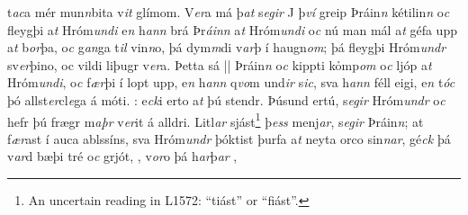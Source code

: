 t\textit{ac}a mér mun\textit{n}bita   v\textit{it} glímom. V\textit{er}a má þ\textit{at}
s\textit{egir}  J þ\textit{ví} greip Þráin\textit{n} kétilin\textit{n}
o\textit{c}  fleygþi   a\textit{t} Hróm\textit{undi}
e\textit{n} h\textit{ann} brá    Þr\textit{áinn} a\textit{t} Hróm\textit{undi} o\textit{c}  nú man mál a\textit{t} géfa upp a\textit{t} b\textit{or}þa, o\textit{c} g\textit{an}ga t\textit{il} vin\textit{n}o, þá dym\textit{m}di    v\textit{ar}þ í haugn\textit{om}; þá  fleygþi
Hróm\textit{undr} sv\textit{er}þino, oc vildi   liþugr   v\textit{er}a. Þetta sá 
||
 Þráin\textit{n} o\textit{c}  kippti  kỏmp\textit{om}
o\textit{c} ljóp a\textit{t} Hróm\textit{undi}, o\textit{c} f\textit{ær}þi   í  lopt upp, e\textit{n} h\textit{ann} q\textit{vo}m 
 und\textit{ir} s\textit{ic}, 
sva h\textit{ann} féll  eigi,
e\textit{n} t\textit{óc} þó allst\textit{er}cl\textit{e}ga á móti.  
: e\textit{ck}i  erto   a\textit{t} þú stendr. 
Þúsund   ertú,  s\textit{egir} Hróm\textit{undr} o\textit{c} hefr þú
frægr m\textit{aþr} v\textit{er}it á   alldri. Litl\textit{ar} sjást\footnote{An uncertain reading in L1572: \enquote{tiást} or \enquote{fiást}.}  þ\textit{ess} menj\textit{ar}, s\textit{egir}
Þráin\textit{n}; 
 at  f\textit{ær}ast í auca ablssíns, sva Hróm\textit{undr} þóktist þurfa  a\textit{t} neyta orco sin\textit{n}\textit{ar}, gé\textit{ck} þá    v\textit{ar}d bæþi  tré o\textit{c} grjót,  , v\textit{or}o  þá h\textit{ar}þ\textit{ar} ,    
